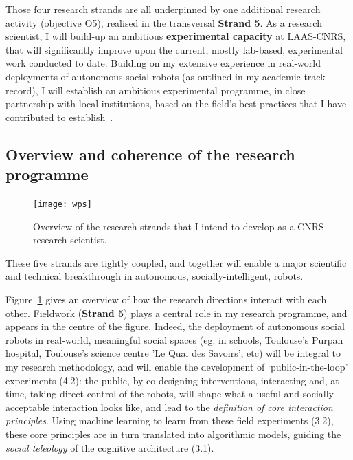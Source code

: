 Those four research strands are all underpinned by one additional research
activity (objective O5), realised in the transversal {\bf Strand 5}. As a
research scientist, I will build-up an ambitious \textbf{experimental capacity}
at LAAS-CNRS, that will significantly improve upon the current, mostly
lab-based, experimental work conducted to date. Building on my extensive
experience in real-world deployments of autonomous social robots (as outlined in
my academic track-record), I will establish an ambitious experimental programme,
in close partnership with local institutions, based on the field's best
practices that I have contributed to
establish~\parencite{baxter2016characterising}.



\subsection{Overview and coherence of the research programme}

\begin{figure}[h!]
\centering
\texttt{[image: wps]}
\caption{Overview of the research strands that I intend to develop as a CNRS
    research scientist.}
\label{fig:wps}
\end{figure}

These five strands are tightly coupled, and together will enable a major
scientific and technical breakthrough in autonomous, socially-intelligent,
robots.

Figure~\ref{fig:wps} gives an overview of how the research directions interact
with each other. Fieldwork (\textbf{Strand 5}) plays a central role in my research programme, and
appears in the centre of the figure. Indeed, the deployment of autonomous social
robots in real-world, meaningful social spaces (eg. in schools, Toulouse's
Purpan hospital, Toulouse's science centre 'Le Quai des Savoirs', etc) will be
integral to my research methodology, and will enable the development of
`public-in-the-loop' experiments (4.2): the public, by co-designing interventions,
interacting and, at time, taking direct control of the robots, will shape what a
useful and socially acceptable interaction looks like, and lead to the
\emph{definition of core interaction principles}. Using machine learning to learn from
these field experiments (3.2), these core principles are in turn translated into
algorithmic models, guiding the \emph{social teleology} of the cognitive architecture
(3.1).

